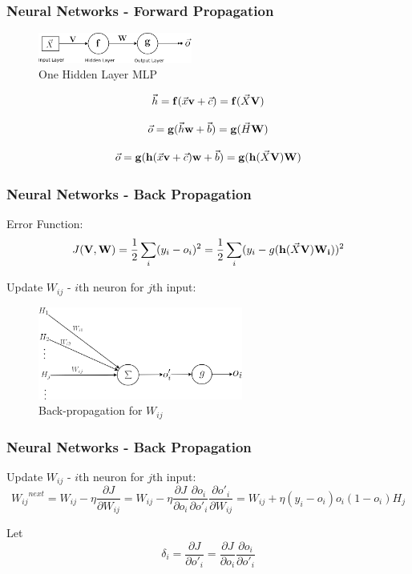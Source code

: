 \documentclass{beamer}
\begin{document}
\begin{frame}
\frametitle{Neural Networks - Forward Propagation}
\begin{figure}[t!]
    \centering
    \includegraphics[width=0.45\textwidth]{../paper/pictures/figures/MLP.png}
    \caption{One Hidden Layer MLP}
    \label{fig:MLP}
\end{figure}

$$\vec{h} = \bold{f}(\vec{x}\bold{v}+\vec{c}) = \bold{f}(\vec{X}\bold{V})$$

$$\vec{o} = \bold{g}(\vec{h}\bold{w}+\vec{b}) = \bold{g}(\vec{H}\bold{W})$$

$$\vec{o} = \bold{g}(\bold{h}(\vec{x}\bold{v}+\vec{c})\bold{w}+\vec{b}) = \bold{g}(\bold{h}(\vec{X}\bold{V})\bold{W})$$
\end{frame}

\begin{frame}
\frametitle{Neural Networks - Back Propagation}
Error Function:
$$J(\bold{V}, \bold{W}) = \frac{1}{2}\sum_{i}(y_i-o_i)^2 =\frac{1}{2}\sum_{i}(y_i-g(\bold{h}(\vec{X}\bold{V})\bold{W_i}))^2$$

Update $W_{ij}$ - $i$th neuron for $j$th input:
\begin{figure}[t!]
    \centering
    \includegraphics[width=0.6\textwidth]{../paper/pictures/figures/BP1.png}
    \caption{Back-propagation for $W_{ij}$}
    \label{fig:BP1}
\end{figure}
\end{frame}

\begin{frame}
\frametitle{Neural Networks - Back Propagation}
Update $W_{ij}$ - $i$th neuron for $j$th input:
$$
{{W_{ij}}^{next}}
= W_{ij} - \eta\frac{\partial J}{\partial W_{ij}}
= W_{ij} - \eta\frac{\partial J}{\partial o_i}\frac{\partial o_i}{\partial o'_i}\frac{\partial o'_i}{\partial W_{ij}}
= W_{ij} + \eta(y_i-o_i)o_i(1-o_i)H_j
$$

Let
$$
\delta_i
= \frac{\partial J}{\partial o'_i}
= \frac{\partial J}{\partial o_i}\frac{\partial o_i}{\partial o'_i}
$$
\end{frame}
\end{document}
